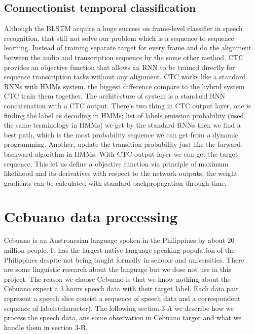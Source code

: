 \documentclass[conference]{IEEEtran}
\begin{document}
\subsection{Connectionist temporal classification}
Although the BLSTM acquire a huge success on frame-level classifier in speech recognition, that still not solve our problem which is a sequence to sequence learning.  Instead of training separate target for every frame and do the alignment between the audio and transcription sequence by the some other method, CTC provides an objective function that allows an RNN to be trained directly for sequence transcription tasks without any alignment.  CTC works like a standard RNNs with HMMs system, the biggest difference compare to the hybrid system CTC train them together.  The architecture of system is a standard RNN concatenation with a CTC output.  There's two thing in CTC output layer, one is finding the label as decoding in HMMs; list of labels emission probability (used the same terminology in HMMs) we get by the standard RNNs then we find a best path, which is the most probability sequence we can get from a dynamic programming.  Another, update the transition probability just like the forward-backward  algorithm in HMMs.  With CTC output layer we can get the target sequence.   This let us define a objective function via principle of maximum likelihood and its derivatives with respect to the network outputs, the weight gradients can be calculated with standard backpropagation through time.  

\section{Cebuano data processing}
Cebuano is an Austronesian language spoken in the Philippines by about 20 million people.  It has the largest native language-speaking population of the Philippines despite not being taught formally in schools and universities.  There are some linguistic research about the language but we dose not use in this project.  The reason we choose Cebuano is that we know nothing about the Cebuano expect a 3 hours speech data with their target label.  Each data pair represent a speech slice consist a sequence of speech data and a correspondent sequence of labels(character).  The following section 3-A we describe how we process the speech data, ans  some observation in Cebuano target and what we handle them in section 3-B.  
\end{document}
